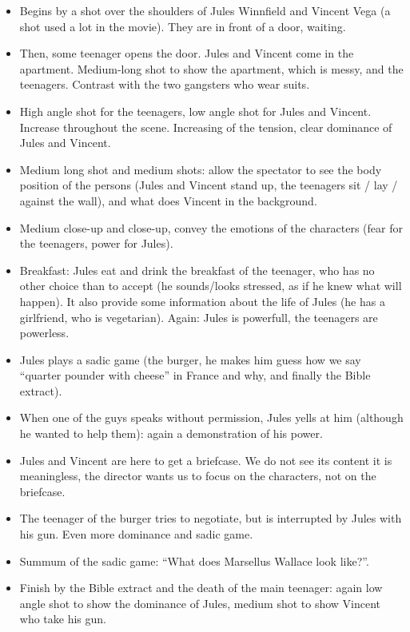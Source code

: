 \documentclass[a4paper,12pt]{article}
\begin{document}
\begin{itemize}
    \item Begins by a shot over the shoulders of Jules Winnfield and Vincent Vega
(a shot used a lot in the movie). They are in front of a door, waiting.
    \item Then, some teenager opens the door. Jules and Vincent come in the apartment.
Medium-long shot to show the apartment, which is messy, and the teenagers. Contrast
with the two gangsters who wear suits.
    \item High angle shot for the teenagers, low angle shot for Jules and Vincent.
Increase throughout the scene. Increasing of the tension, clear dominance of Jules
and Vincent.
    \item Medium long shot and medium shots: allow the spectator to see the body
position of the persons (Jules and Vincent stand up, the teenagers sit / lay /
against the wall), and what does Vincent in the background.
    \item Medium close-up and close-up, convey the emotions of the characters
(fear for the teenagers, power for Jules).
    \item Breakfast: Jules eat and drink the breakfast of the teenager, who has
no other choice than to accept (he sounds/looks stressed, as if he knew what will
happen). It also provide some information about the life of Jules (he has a girlfriend,
who is vegetarian). Again: Jules is powerfull, the teenagers are powerless.
    \item Jules plays a sadic game (the burger, he makes him guess how we say
``quarter pounder with cheese'' in France and why, and finally the Bible extract).
    \item When one of the guys speaks without permission, Jules yells at him
(although he wanted to help them): again a demonstration of his power.
    \item Jules and Vincent are here to get a briefcase. We do not see its content
it is meaningless, the director wants us to focus on the characters, not on the
briefcase.
    \item The teenager of the burger tries to negotiate, but is interrupted by
Jules with his gun. Even more dominance and sadic game.
    \item Summum of the sadic game: ``What does Marsellus Wallace look like?''.
    \item Finish by the Bible extract and the death of the main teenager: again
low angle shot to show the dominance of Jules, medium shot to show Vincent who
take his gun.
\end{itemize}
\end{document}
